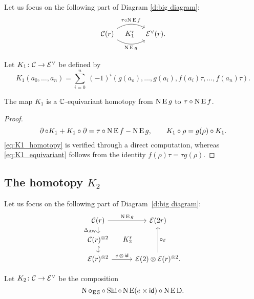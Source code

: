 Let us focus on the following part of Diagram \eqref{d:big diagram}:
\[
\begin{tikzcd}[column sep=large]
	\cC(r)
	\arrow[r,bend left,"\tau \comp \chains\EE f"]
	\arrow[r,bend right,"\chains\EE g"']
	\arrow[r,phantom,"K_1^r"]
	& \BE^\vee(r).
\end{tikzcd}
\]

\begin{definition}
	Let $K_1 \colon \mathcal{C} \to \mathcal{E}^\vee$ be defined by
	\[
	K_1(a_0,\dots,a_n) =
	\sum_{i=0}^n \ (-1)^i (g(a_o), \dots, g(a_i), f(a_i) \tau, \dots, f(a_n) \tau).
	\]
\end{definition}

\begin{lemma}
	The map $K_1$ is a $\mathbb{C}$-equivariant homotopy from $\operatorname{N} \operatorname{E} g$ to $\tau \mathbin{\circ} \operatorname{N} \operatorname{E} f$.
\end{lemma}

\begin{proof}
	\TBW
	\[
	\operatorname{\partial} \circ K_1 + K_1 \circ \operatorname{\partial} = \tau \mathbin{\circ} \operatorname{N} \operatorname{E} f - \operatorname{N} \operatorname{E} g,
	\qquad
	K_1 \circ \rho = g(\rho) \circ K_1.
	\]
	\cref{eq:K1_homotopy} is verified through a direct computation, whereas \cref{eq:K1_equivariant} follows from the identity $f(\rho) \tau = \tau g(\rho)$.
\end{proof}

\subsection{The homotopy $K_2$}

Let us focus on the following part of Diagram~\eqref{d:big diagram}:
\begin{equation}\label{d:K2}
	\begin{tikzcd}[row sep=small]
		\cC(r)
		\arrow[r,"\chains\EE g"]
		\arrow[d,"\Delta_{\AW}"']
		\arrow[ddr,phantom,"K_2^r",shift left=0pt]
		&[5pt] \BE(2r)
		\\
		\cC(r)^{\ot 2}
		\arrow[d,hook] & \\
		\BE(r)^{\ot 2}
		\arrow[r,"e\, \ot\, \id"]
		& \BE(2) \ot \BE(r)^{\ot 2}.
		\arrow[uu,"\bcirc_\BE"']
	\end{tikzcd}
\end{equation}

\begin{definition}
	Let $K_2 \colon \mathcal{C} \to \mathcal{E}^\vee$ be the composition
	\[
	\operatorname{N}\bm{\circ}_{\operatorname{E}\mathbb{S}} \circ \operatorname{Shi} \circ \operatorname{N}\operatorname{E}(e \times \mathsf{id}) \circ \operatorname{N}\operatorname{E}\mathrm{D}.
	\]
\end{definition}

